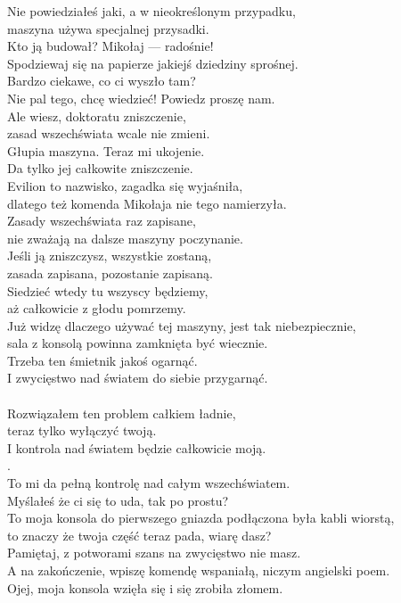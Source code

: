 \charfer{}
Nie powiedziałeś jaki, a w nieokreślonym przypadku,\\
maszyna używa specjalnej przysadki.\\
Kto ją budował? Mikołaj --- radośnie!\\
Spodziewaj się na papierze jakiejś dziedziny sprośnej.\\
Bardzo ciekawe, co ci wyszło tam?\\
Nie pal tego, chcę wiedzieć! Powiedz proszę nam.\\
Ale wiesz, doktoratu zniszczenie,\\
zasad wszechświata wcale nie zmieni.\\

\charszam{}
Głupia maszyna. Teraz mi ukojenie.\\
Da tylko jej całkowite zniszczenie.\\

\charfer{}
Evilion to nazwisko, zagadka się wyjaśniła,\\
dlatego też komenda Mikołaja nie tego namierzyła.\\
Zasady wszechświata raz zapisane,\\
nie zważają na dalsze maszyny poczynanie.\\
Jeśli ją zniszczysz, wszystkie zostaną,\\
zasada zapisana, pozostanie zapisaną.\\
Siedzieć wtedy tu wszyscy będziemy,\\
aż całkowicie z głodu pomrzemy.\\

\charszam{}
Już widzę dlaczego używać tej maszyny, jest tak niebezpiecznie,\\
sala z konsolą powinna zamknięta być wiecznie.\\
Trzeba ten śmietnik jakoś ogarnąć.\\
I zwycięstwo nad światem do siebie przygarnąć.\\
\\
Rozwiązałem ten problem całkiem ładnie,\\
teraz tylko wyłączyć twoją.\\
I kontrola nad światem będzie całkowicie moją.\\
.\\
To mi da pełną kontrolę nad całym wszechświatem.\\

\charfer{}
Myślałeś że ci się to uda, tak po prostu?\\
To moja konsola do pierwszego gniazda podłączona była kabli wiorstą,\\
to znaczy że twoja część teraz pada, wiarę dasz?\\
Pamiętaj, z potworami szans na zwycięstwo nie masz.\\
A na zakończenie, wpiszę komendę wspaniałą, niczym angielski poem.\\
Ojej, moja konsola wzięła się i się zrobiła złomem.\\

